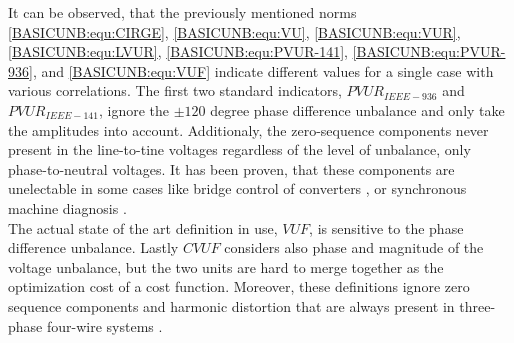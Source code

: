 			It can be observed, that the previously mentioned norms \ref{BASICUNB:equ:CIRGE}, \ref{BASICUNB:equ:VU}, \ref{BASICUNB:equ:VUR}, \ref{BASICUNB:equ:LVUR}, \ref{BASICUNB:equ:PVUR-141}, \ref{BASICUNB:equ:PVUR-936}, and \ref{BASICUNB:equ:VUF}  indicate different values for a single case with various correlations. The first two standard indicators, $PVUR_{IEEE-936}$ and $PVUR_{IEEE-141}$, ignore the $\pm120$ degree phase difference unbalance and only take the amplitudes into account. Additionaly, the zero-sequence components never present in the line-to-tine voltages regardless of the level of unbalance, only phase-to-neutral voltages. It has been proven, that these components are unelectable in some cases like bridge control of converters \cite{betz2006symmetry}, or synchronous machine diagnosis \cite{hang2015online}.\\
			The actual state of the art definition in use, $VUF$, is sensitive to the phase difference unbalance. Lastly $CVUF$ considers also phase and magnitude of the voltage unbalance, but the two units are hard to merge together as the optimization cost of a cost function. Moreover, these definitions ignore zero sequence components and harmonic distortion that are always present in three-phase four-wire systems \cite{bina2011three}.
		


